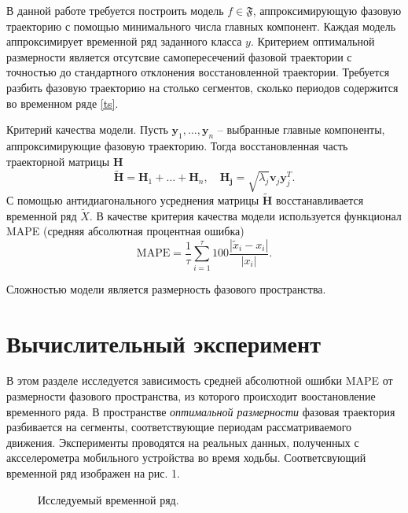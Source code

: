 \documentclass[12pt, twoside]{article}
\begin{document}
В данной работе требуется построить модель $f\in\mathfrak{F}$, аппроксимирующую фазовую траекторию с помощью минимального числа главных компонент. Каждая модель аппроксимирует временной ряд заданного класса $y$. Критерием оптимальной размерности является отсутсвие самопересечений фазовой траектории с точностью до стандартного отклонения восстановленной траектории. Требуется разбить фазовую траекторию на столько сегментов, сколько периодов содержится во временном ряде \eqref{ts}.
    \begin{figure}[ht]
    \end{figure}

Критерий качества модели. Пусть $\mathbf{y}_1,\dots,\mathbf{y}_n$ -- выбранные главные компоненты, аппроксимирующие фазовую траекторию. Тогда восстановленная часть траекторной матрицы $\mathbf{H}$
    \[ \mathbf{\widetilde{H}} = \mathbf{H}_1  + \dots + \mathbf{H}_n, \quad \mathbf{H_j} = \sqrt{\lambda_j}\mathbf{v}_j\mathbf{y}_j^T.\]
С помощью антидиагонального усреднения матрицы $\mathbf{\tilde{H}}$ восстанавливается временной ряд $\tilde{X}$. В качестве критерия качества модели используется функционал MAPE (средняя абсолютная процентная ошибка)
    \[ \text{MAPE} = \frac{1}{\tau}\sum_{i = 1}^{\tau}100\frac{|\tilde{x}_i - x_i|}{|x_i|}. \]
    
Сложностью модели является размерность фазового пространства.
    \begin{figure}[ht]
    \end{figure}
    
\section{Вычислительный эксперимент}
В этом разделе исследуется зависимость средней абсолютной ошибки MAPE от размерности фазового пространства, из которого происходит воостановление временного ряда. В пространстве \emph{оптимальной размерности} фазовая траектория разбивается на сегменты, соответствующие периодам рассматриваемого движения. Эксперименты проводятся на реальных данных, полученных с аксселерометра мобильного устройства во время ходьбы. Соответсвующий временной ряд изображен на рис. 1.

    \begin{figure}[h!]
	    \caption{Исследуемый временной ряд.}
    \end{figure}
    
\end{document}
